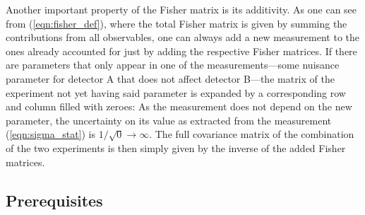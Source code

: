 Another important property of the Fisher matrix is its additivity. As one can
see from (\ref{eqn:fisher_def}), where the total Fisher matrix is given by 
summing the contributions from all observables, one can always add a new
measurement to the ones already accounted for just by adding the respective
Fisher matrices. If there are parameters that only appear in one of the
measurements---\eg some nuisance parameter for detector A that does not 
affect detector B---the matrix of the experiment
not yet having said parameter is expanded by a corresponding row and column
filled with zeroes: As the measurement does not depend on the new parameter, the
uncertainty on its value as extracted from the measurement
(\ref{eqn:sigma_stat}) is $1/\sqrt{0} \to \infty$. The full covariance matrix of
the combination of the two experiments is then simply given by the inverse of
the added Fisher matrices.

\subsection{Prerequisites}
\label{sec:fisher_prereq}

